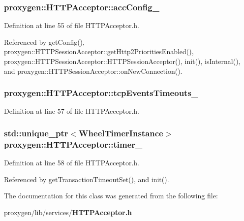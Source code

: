 \subsubsection[{acc\+Config\+\_\+}]{ proxygen\+::\+H\+T\+T\+P\+Acceptor\+::acc\+Config\+\_\+\hspace{0.3cm}{\ttfamily [protected]}}\label{classproxygen_1_1HTTPAcceptor_a5092ba61a329885849049e2e6e360a98}


Definition at line 55 of file H\+T\+T\+P\+Acceptor.\+h.



Referenced by get\+Config(), proxygen\+::\+H\+T\+T\+P\+Session\+Acceptor\+::get\+Http2\+Priorities\+Enabled(), proxygen\+::\+H\+T\+T\+P\+Session\+Acceptor\+::\+H\+T\+T\+P\+Session\+Acceptor(), init(), is\+Internal(), and proxygen\+::\+H\+T\+T\+P\+Session\+Acceptor\+::on\+New\+Connection().

\subsubsection[{tcp\+Events\+Timeouts\+\_\+}]{ proxygen\+::\+H\+T\+T\+P\+Acceptor\+::tcp\+Events\+Timeouts\+\_\+\hspace{0.3cm}{\ttfamily [private]}}\label{classproxygen_1_1HTTPAcceptor_af803520b6a6f3b5b87c2d5d8c5ad5848}


Definition at line 57 of file H\+T\+T\+P\+Acceptor.\+h.

\subsubsection[{timer\+\_\+}]{\setlength{\rightskip}{0pt plus 5cm}std\+::unique\+\_\+ptr$<${\bf Wheel\+Timer\+Instance}$>$ proxygen\+::\+H\+T\+T\+P\+Acceptor\+::timer\+\_\+\hspace{0.3cm}{\ttfamily [private]}}\label{classproxygen_1_1HTTPAcceptor_a50b5526f9903868be1ba975613bb54f2}


Definition at line 58 of file H\+T\+T\+P\+Acceptor.\+h.



Referenced by get\+Transaction\+Timeout\+Set(), and init().



The documentation for this class was generated from the following file\+:\begin{DoxyCompactItemize}
\item 
proxygen/lib/services/{\bf H\+T\+T\+P\+Acceptor.\+h}\end{DoxyCompactItemize}
